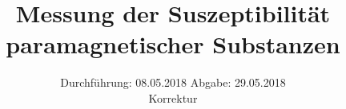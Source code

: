 

\subject{606}
\title{Messung der Suszeptibilität paramagnetischer Substanzen}
\date{%
  Durchführung: 08.05.2018
  \hspace{3em}
  Abgabe: 29.05.2018 \\
  Korrektur
}



\maketitle
\thispagestyle{empty}
\tableofcontents
\newpage






\printbibliography{}


